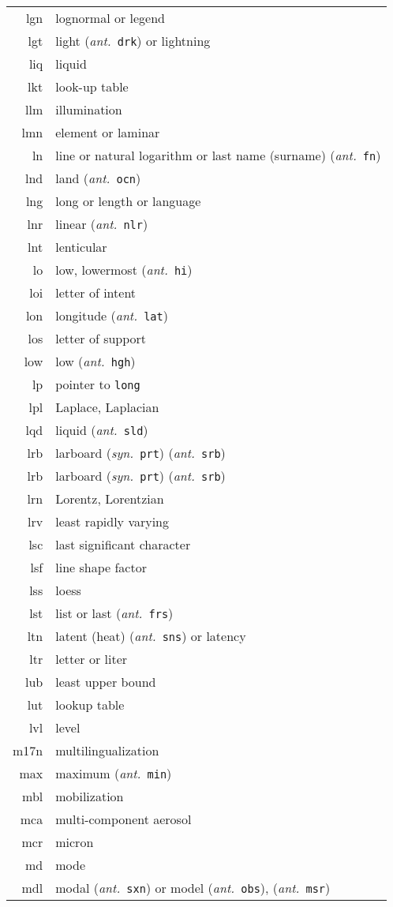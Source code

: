\documentclass[12pt,twoside]{article}
\newcommand{\ant}[1]{(\textit{ant.}~\texttt{#1})}
\newcommand{\syn}[1]{(\textit{syn.}~\texttt{#1})}
\begin{document}
\begin{longtable}[>{\bfseries}l]{>{\ttfamily}r l}
lgn & lognormal or legend \\
lgt & light \ant{drk} or lightning \\
liq & liquid \\
lkt & look-up table \\
llm & illumination \\
lmn & element or laminar \\
ln & line or natural logarithm or last name (surname) \ant{fn} \\
lnd & land \ant{ocn} \\
lng & long or length or language \\
lnr & linear \ant{nlr} \\
lnt & lenticular \\
lo & low, lowermost \ant{hi} \\
loi & letter of intent \\
lon & longitude \ant{lat} \\
los & letter of support \\
low & low \ant{hgh} \\
lp & pointer to \texttt{long} \\
lpl & Laplace, Laplacian \\
lqd & liquid \ant{sld} \\
lrb & larboard \syn{prt} \ant{srb} \\
lrb & larboard \syn{prt} \ant{srb} \\
lrn & Lorentz, Lorentzian \\
lrv & least rapidly varying \\
lsc & last significant character \\
lsf & line shape factor \\
lss & loess \\
lst & list or last \ant{frs} \\
ltn & latent (heat) \ant{sns} or latency \\
ltr & letter or liter \\
lub & least upper bound \\
lut & lookup table \\
lvl & level \\
m17n & multilingualization \\
max & maximum \ant{min} \\
mbl & mobilization \\
mca & multi-component aerosol \\
mcr & micron \\
md & mode \\
mdl & modal \ant{sxn} or model \ant{obs}, \ant{msr} \\

\end{longtable}
\end{document}
